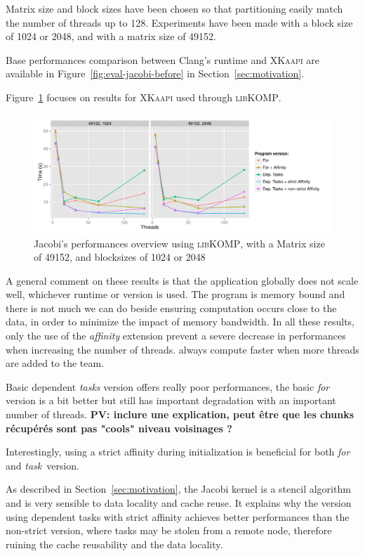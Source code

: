 \documentclass{Styles/llncs}
\newcommand{\kaapi}{\textsc{\mbox{XKaapi}}\xspace}
\newcommand{\libXKOMP}{\textsc{libKOMP}\xspace}
\newcommand{\PV}[1]{{\color{purple}\bfseries PV: #1}}
\begin{document}
Matrix size and block sizes have been chosen so that partitioning easily match
the number of threads up to 128. Experiments have been made with a block size of 1024
or 2048, and with a matrix size of 49152.

Base performances comparison between Clang's runtime and \kaapi are available in Figure~\ref{fig:eval-jacobi-before} in Section~\ref{sec:motivation}.

Figure~\ref{fig:eval-jacobi} focuses on results for \kaapi used through \libXKOMP.

\begin{figure}[t]
  \centering
  \includegraphics[scale=0.6]{graphs/jacobi_scale.pdf}
  \caption{Jacobi's performances overview using \libXKOMP, with a Matrix size of 49152, and blocksizes of 1024 or 2048}
\label{fig:eval-jacobi}
\end{figure}

A general comment on these results is that the application globally does not scale well, whichever runtime or version is used.
The program is memory bound and there is not much we can do beside ensuring computation occurs
close to the data, in order to minimize the impact of memory bandwidth.
In all these results, only the use of the \emph{affinity} extension prevent
a severe decrease in performances when increasing the number of threads.
always compute faster when more threads are added to the team.

Basic dependent \emph{tasks} version offers really poor performances, the basic
\emph{for} version is a bit better but still has important degradation with an
important number of threads.
\PV{inclure une explication, peut être que les chunks récupérés sont pas "cools" niveau voisinages ?}

Interestingly, using a strict affinity during initialization is beneficial for both \emph{for} and \emph{task} version.

As described in Section~\ref{sec:motivation}, the Jacobi kernel is a stencil algorithm
and is very sensible to data locality and cache reuse. It explains why the
version using dependent tasks with strict affinity achieves better performances than the non-strict version,
where tasks may be stolen from a remote node, therefore ruining the cache reusability
and the data locality.
\end{document}
